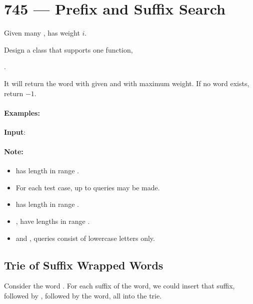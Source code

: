 \section{745 --- Prefix and Suffix Search}
Given many ,  has weight $i$.

Design a class  that supports one function, 

. 

It will return the word with given  and  with maximum weight. If no word exists, return $-1$.

\paragraph{Examples:}

\textbf{Input}:

\begin{flushleft}



\end{flushleft}
 

\paragraph{Note:}

\begin{itemize}
\item {} has length in range \fcj{[1, 15000]}.
\item For each test case, up to  queries  may be made.
\item {} has length in range \fcj{[1, 10]}.
\item {},  have lengths in range \fcj{[0, 10]}.
\item {} and ,  queries consist of lowercase letters only.
\end{itemize}

\subsection{Trie of Suffix Wrapped Words}
Consider the word . For each suffix of the word, we could insert that suffix, followed by , followed by the word, all into the trie.

